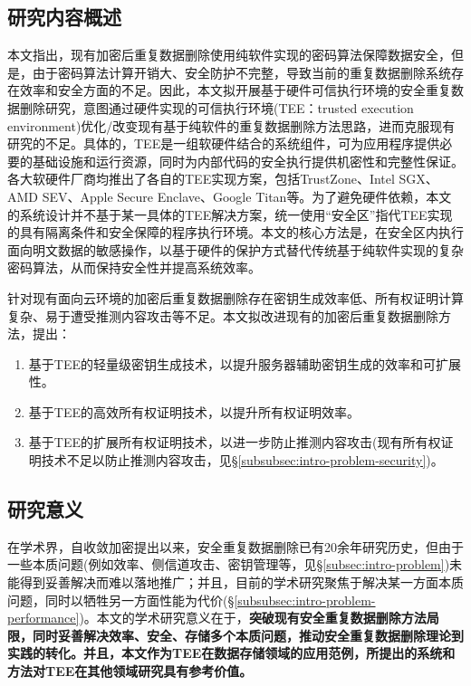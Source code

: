 \subsection{研究内容概述}
\label{subsec:intro-content}

本文指出，现有加密后重复数据删除使用纯软件实现的密码算法保障数据安全，但是，由于密码算法计算开销大、安全防护不完整，导致当前的重复数据删除系统存在效率和安全方面的不足。因此，本文拟开展基于硬件可信执行环境的安全重复数据删除研究，意图通过硬件实现的可信执行环境(TEE：trusted execution environment)优化/改变现有基于纯软件的重复数据删除方法思路，进而克服现有研究的不足。具体的，TEE是一组软硬件结合的系统组件，可为应用程序提供必要的基础设施和运行资源，同时为内部代码的安全执行提供机密性和完整性保证\cite{OMTP}。各大软硬件厂商均推出了各自的TEE实现方案，包括TrustZone\cite{trustzone}、Intel SGX\cite{sgx,sgx2}、AMD SEV\cite{AMDSEV}、Apple Secure Enclave\cite{AppleSecureEnclave}、Google Titan\cite{GoogleTitan}等。为了避免硬件依赖，本文的系统设计并不基于某一具体的TEE解决方案，统一使用“安全区”指代TEE实现的具有隔离条件和安全保障的程序执行环境。本文的核心方法是，在安全区内执行面向明文数据的敏感操作，以基于硬件的保护方式替代传统基于纯软件实现的复杂密码算法，从而保持安全性并提高系统效率。

针对现有面向云环境的加密后重复数据删除存在密钥生成效率低、所有权证明计算复杂、易于遭受推测内容攻击等不足。本文拟改进现有的加密后重复数据删除方法，提出：

\begin{enumerate}[leftmargin=*]
    \item 基于TEE的轻量级密钥生成技术，以提升服务器辅助密钥生成的效率和可扩展性。
    \item 基于TEE的高效所有权证明技术，以提升所有权证明效率。
    \item 基于TEE的扩展所有权证明技术，以进一步防止推测内容攻击(现有所有权证明技术不足以防止推测内容攻击，见\S\ref{subsubsec:intro-problem-security})。
\end{enumerate}

\subsection{研究意义}
\label{subsec:intro-meaning}

在学术界，自收敛加密\cite{douceur2002reclaiming}提出以来，安全重复数据删除已有20余年研究历史，但由于一些本质问题(例如效率、侧信道攻击、密钥管理等，见\S\ref{subsec:intro-problem})未能得到妥善解决而难以落地推广；并且，目前的学术研究聚焦于解决某一方面本质问题，同时以牺牲另一方面性能为代价(\S\ref{subsubsec:intro-problem-performance})。本文的学术研究意义在于，\textbf{突破现有安全重复数据删除方法局限，同时妥善解决效率、安全、存储多个本质问题，推动安全重复数据删除理论到实践的转化。并且，本文作为TEE在数据存储领域的应用范例，所提出的系统和方法对TEE在其他领域研究具有参考价值。}

